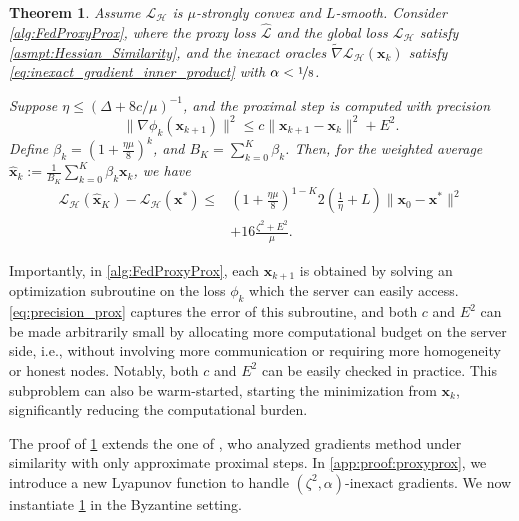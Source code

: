 \documentclass{article}
\def\vx{{\bm{x}}}
\newcommand{\cH}{\mathcal{H}}
\newcommand{\cL}{\mathcal{L}}
\theoremstyle{plain}
\newtheorem{theorem}{Theorem}[section]
\theoremstyle{definition}
\theoremstyle{remark}
\begin{document}
\begin{theorem}
\label{thm:proxyprox_conv}
    Assume $\cL_{\cH}$ is $\mu$-strongly convex and $L$-smooth. Consider \cref{alg:FedProxyProx}, where the proxy loss $\hat{\cL}$ and the global loss $\cL_{\cH}$ satisfy \cref{asmpt:Hessian_Similarity}, and the inexact oracles $\tilde{\nabla}\cL_{\cH}(\vx_k)$ satisfy \cref{eq:inexact_gradient_inner_product} with $\alpha < \nicefrac{1}{8}$.

    Suppose $\eta \le (\Delta + 8c/\mu)^{-1}$, and the proximal step is computed with precision
    \begin{equation}
    \label{eq:precision_prox}
    \|\nabla \phi_k(\vx_{k+1})\|^2 \le c\|\vx_{k+1} - \vx_k\|^2 + E^2.
    \end{equation}
    Define $\beta_k = (1 + \frac{\eta \mu}{8})^{k}$, and $B_K = \sum_{k=0}^K \beta_k$. Then, for the weighted average $\hat{\vx}_k := \frac{1}{B_K}\sum_{k=0}^K \beta_k \vx_k$, we have
    \begin{align*}
    \cL_{\cH}(\hat\vx_{K}) - \cL_{\cH}(\vx^*) \le & \left(1 + \frac{\eta \mu}{8}\right)^{1-K}\!2\!\left(\!\frac{1}{\eta} + L\!\right)\!\|\vx_0 - \vx^*\|^2 \\
    & + 16\frac{\zeta^2 + E^2}{\mu}.
    \end{align*}
\end{theorem}
Importantly, in \cref{alg:FedProxyProx}, each $\vx_{k+1}$ is obtained by solving an optimization subroutine on the loss $\phi_k$ which the server can easily access. \cref{eq:precision_prox} captures the error of this subroutine, and both $c$ and $E^2$ can be made arbitrarily small by allocating more computational budget on the server side, i.e., without involving more communication or requiring more homogeneity or honest nodes. Notably, both $c$ and $E^2$ can be easily checked in practice. This subproblem can also be warm-started, starting the minimization from $\vx_k$, significantly reducing the computational burden.

The proof of \cref{thm:proxyprox_conv} extends the one of \citet{woodworth2023two}, who analyzed gradients method under similarity with only approximate proximal steps. In \cref{app:proof:proxyprox}, we introduce a new Lyapunov function to handle $(\zeta^2,\alpha)$-inexact gradients. We now instantiate \cref{thm:proxyprox_conv} in the Byzantine setting.
\end{document}
